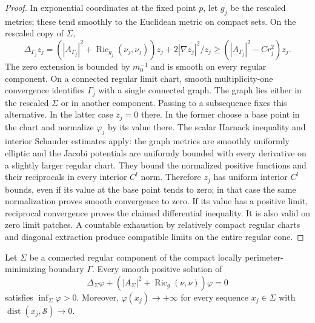 \begin{proof}
In exponential coordinates at the fixed point $p$, let $g_j$ be the
rescaled metrics; these tend smoothly to the Euclidean metric on
compact sets.  On the rescaled copy of $\Sigma$,
\[
 \Delta_{\Gamma_j}z_j
 =(|A_{\Gamma_j}|^2+
       \operatorname{Ric}_{g_j}(\nu_j,\nu_j))z_j
       +2|\nabla z_j|^2/z_j
 \geq(|A_{\Gamma_j}|^2-Cr_j^2)z_j.
\]
The zero extension is bounded by $m_0^{-1}$ and is smooth on every
regular component.  On a connected regular limit chart, smooth
multiplicity-one convergence identifies $\Gamma_j$ with a single
connected graph.  The graph lies either in the rescaled $\Sigma$ or
in another component.  Passing to a subsequence fixes this alternative.
In the latter case $z_j=0$ there.  In the former choose a base point
in the chart and normalize $\varphi_j$ by its value there.
The scalar Harnack inequality and interior Schauder estimates
\cite{GilbargTrudinger2001} apply: the graph metrics are smoothly
uniformly elliptic and the Jacobi potentials are uniformly bounded
with every derivative on a slightly larger regular chart.
They bound the normalized positive functions and their reciprocals
in every interior $C^l$ norm.  Therefore $z_j$ has uniform interior
$C^l$ bounds, even if its value at the base point tends to zero; in
that case the same normalization proves smooth convergence to zero.
If its value has a positive limit, reciprocal convergence proves
the claimed differential inequality.  It is also valid on zero
limit patches.  A countable exhaustion by relatively compact
regular charts and diagonal extraction produce compatible limits
on the entire regular cone.
\end{proof}

\begin{lemma}
\label{lem:variation:jacobi-singular-ends}
Let $\Sigma$ be a connected regular component of the compact locally
perimeter-minimizing boundary $\Gamma$.  Every smooth positive
solution of
\[
 \Delta_\Sigma\varphi+
 (|A_\Sigma|^2+\operatorname{Ric}_g(\nu,\nu))\varphi=0
\]
satisfies $\inf_\Sigma\varphi>0$.  Moreover,
$\varphi(x_j)\to+\infty$ for every sequence $x_j\in\Sigma$ with
$\operatorname{dist}(x_j,\mathcal S)\to0$.
\end{lemma}

